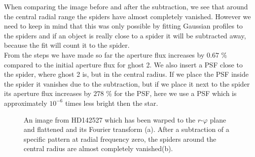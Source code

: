 When comparing the image before and after the subtraction, we see that around the central radial range the spiders have almost completely vanished. However we need to keep in mind that this was only possible by fitting Gaussian profiles to the spiders and if an object is really close to a spider it will be subtracted away, because the fit will count it to the spider. \\
From the steps we have made so far the aperture flux increases by $0.67$ \% compared to the initial aperture flux for ghost 2. We also insert a PSF close to the spider, where ghost 2 is, but in the central radius. If we place the PSF inside the spider it vanishes due to the subtraction, but if we place it next to the spider its aperture flux increases by $278$ \% for the PSF, here we use a PSF which is approximately $10^{-6}$ times less bright then the star. 
\begin{figure}[H]
	\centering
\caption{An image from HD142527 which has been warped to the $r$-$\varphi$ plane and flattened and its Fourier transform (a). After a subtraction of a specific pattern at radial frequency zero, the spiders around the central radius are almost completely vanished(b).}
\label{fig:HDsubtraction}
\end{figure}

